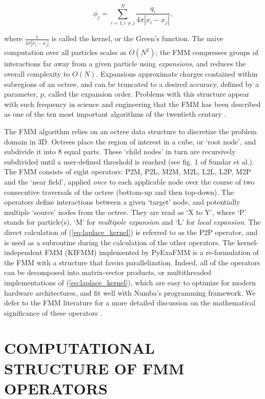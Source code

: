 \documentclass{IEEEcsmag}
\begin{document}
\begin{equation}
    \phi_j = \sum_{i=1, i \neq j}^{N} \frac{q_i}{4 \pi| x_i-x_j |},
    \label{eq:laplace_kernel}
\end{equation}

\noindent where $\frac{1}{4 \pi| x_i-x_j|}$ is called the kernel, or the Green's function. The naive computation over all particles scales as $O(N^2)$; the FMM compresses groups of interactions far away from a given particle using \textit{expansions}, and reduces the overall complexity to $O(N)$. Expansions approximate charges contained within subregions of an octree, and can be truncated to a desired accuracy, defined by a parameter, $p$, called the expansion order. Problems with this structure appear with such frequency in science and engineering that the FMM has been described as one of the ten most important algorithms of the twentieth century \cite{Cipra2000}.

The FMM algorithm relies on an octree data structure to discretize the problem domain in 3D. Octrees place the region of interest in a cube, or `root node', and subdivide it into 8 equal parts. These `child nodes' in turn are recursively subdivided until a user-defined threshold is reached (see fig. 1 of Sundar et al.\cite{Sundar2007}). The FMM consists of eight operators: P2M, P2L, M2M, M2L, L2L, L2P, M2P and the `near field', applied \textit{once} to each applicable node over the course of two consecutive traversals of the octree (bottom-up and then top-down). The operators define interactions between a given `target' node, and potentially multiple `source' nodes from the octree. They are read as `X to Y', where `P' stands for particle(s), `M' for \textit{multipole expansion} and `L' for \textit{local expansion}. The direct calculation of (\ref{eq:laplace_kernel}) is referred to as the P2P operator, and is used as a subroutine during the calculation of the other operators. The kernel-independent FMM (KIFMM) \cite{Ying2004} implemented by PyExaFMM is a re-formulation of the FMM with a structure that favors parallelization. Indeed, all of the operators can be decomposed into matrix-vector products, or multithreaded implementations of (\ref{eq:laplace_kernel}), which are easy to optimize for modern hardware architectures, and fit well with Numba's programming framework. We defer to the FMM literature for a more detailed discussion on the mathematical significance of these operators \cite{Ying2004,Greengard1987}.

\section{COMPUTATIONAL STRUCTURE OF FMM OPERATORS}
\end{document}
